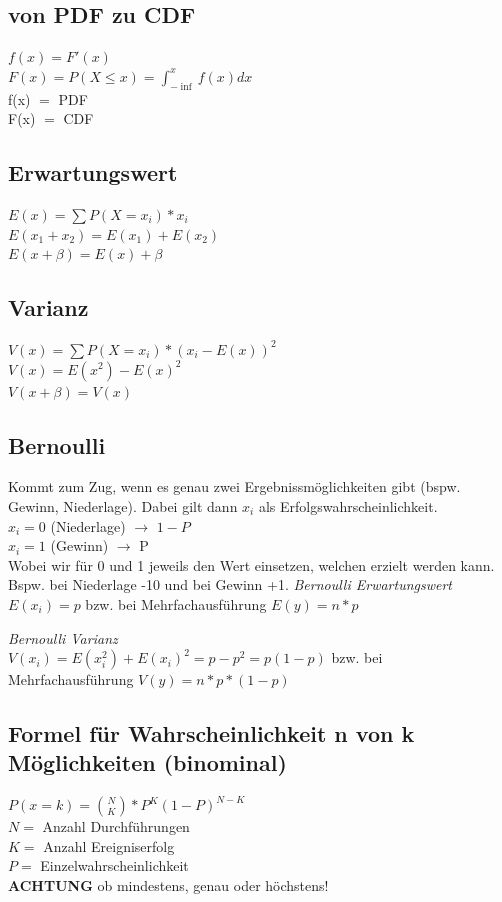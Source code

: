 \documentclass[a4paper]{article}
\theoremstyle{definition}
\theoremstyle{example}
\begin{document}
\subsection{von PDF zu CDF}
$f(x) = F'(x)$\\
$F(x) = P(X \leq x) = \int^x_{-\inf} f(x) dx$\\
f(x) $=$ PDF\\
F(x) $=$ CDF

\subsection{Erwartungswert}
$E(x) = \sum P(X=x_i) * x_i$\\
$E(x_1 + x_2) = E(x_1) + E(x_2)$\\
$E(x + \beta) = E(x) + \beta$

\subsection{Varianz}
$V(x) = \sum P(X=x_i) * (x_i - E(x))^2$\\
$V(x) = E(x^2) - E(x)^2$\\
$V(x + \beta) = V(x)$

\subsection{Bernoulli}
Kommt zum Zug, wenn es genau zwei Ergebnissmöglichkeiten gibt (bspw. Gewinn, Niederlage). Dabei gilt dann $x_i$ als Erfolgswahrscheinlichkeit. \\
$x_i = 0$ (Niederlage) $\rightarrow$ $1-P$\\
$x_i = 1$ (Gewinn) $\rightarrow$ P \\
Wobei wir für 0 und 1 jeweils den Wert einsetzen, welchen erzielt werden kann. Bspw. bei Niederlage -10 und bei Gewinn +1.
\textit{Bernoulli Erwartungswert}\\
$E(x_i) = p$ bzw. bei Mehrfachausführung $E(y) = n*p$ 

\textit{Bernoulli Varianz}\\
$V(x_i) = E(x_i ^2) + E(x_i)^2 = p - p^2 = p(1-p)$ bzw. bei Mehrfachausführung $V(y) = n * p * (1-p)$

\subsection{Formel für Wahrscheinlichkeit n von k Möglichkeiten (binominal)}
$P(x = k) = \binom{N}{K} * P^K (1-P)^{N-K}$\\
$N = $ Anzahl Durchführungen\\
$K = $ Anzahl Ereigniserfolg\\
$P = $ Einzelwahrscheinlichkeit\\
\textbf{ACHTUNG} ob mindestens, genau oder höchstens!
\end{document}

